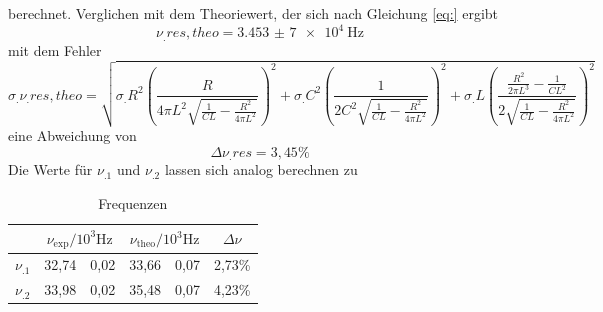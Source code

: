 berechnet.
Verglichen mit dem Theoriewert, der sich nach Gleichung \eqref{eq:} ergibt
\[
\nu_.{res,theo}=\SI{3,453(7)e4}{\hertz}
\]
mit dem Fehler
\[
\sigma_.{\nu_.{res},theo}=\sqrt{\sigma_.R^2\left(\frac{R}{4\pi L^2\sqrt{\frac{1}{CL}-\frac{R^2}{4\pi L^2}}}\right)^2+\sigma_.C^2\left(\frac{1}{2C^2\sqrt{\frac{1}{CL}-\frac{R^2}{4\pi L^2}}}\right)^2+\sigma_.L\left(\frac{\frac{R^2}{2\pi L^3}-\frac{1}{CL^2}}{2\sqrt{\frac{1}{CL}-\frac{R^2}{4\pi L^2}}}\right)^2}
\]
eine Abweichung von
\[
\Delta\nu_.{res}=3,45\%
\]
Die Werte für $\nu_.1$ und $\nu_.2$ lassen sich analog berechnen zu
\begin{table}
	\centering
	\caption{Frequenzen}
\label{tab:tab6}
	\begin{tabular}{cS[table-format=2.2] @{${}\pm{}$} S[table-format=1.2]S[table-format=2.2] @{${}\pm{}$} S[table-format=1.2]S[table-format=1.2]}
		\toprule
		{} &  &  & {$\Delta\nu$} \\
		\midrule
		$\nu_.1$ & 32,74 & 0,02 & 33,66 & 0,07 & 2,73\% \\
		$\nu_.2$ & 33,98 & 0,02 & 35,48 & 0,07 & 4,23\% \\
		\bottomrule
	\end{tabular}
\end{table}

